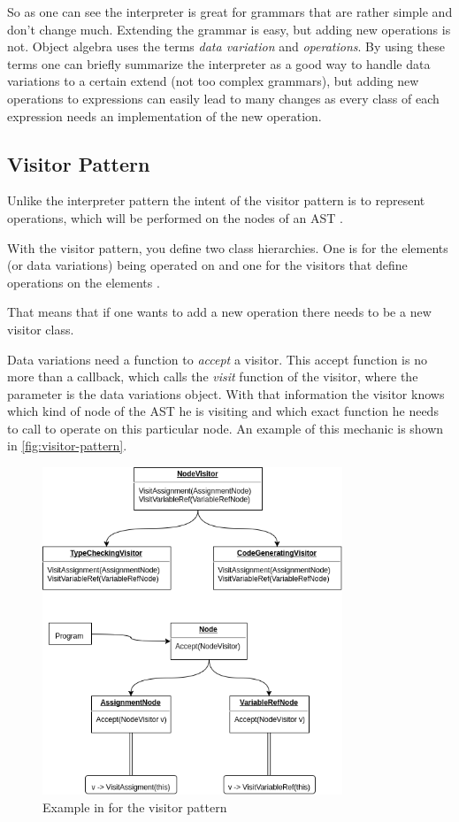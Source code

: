 \documentclass{llncs}
\begin{document}
So as one can see the interpreter is great for grammars that are rather simple and don't change much. Extending the grammar is easy, but adding new operations is not. Object algebra uses the terms \emph{data variation} and \emph{operations}. By using these terms one can briefly summarize the interpreter as a good way to handle data variations to a certain extend (not too complex grammars), but adding new operations to expressions can easily lead to many changes as every class of each expression needs an implementation of the new operation.

\subsection{Visitor Pattern} \label{ssec:visitor}
Unlike the interpreter pattern the intent of the visitor pattern is to represent operations, which will be performed on the nodes of an AST \cite{GHJV94}.

With the visitor pattern, you define two class hierarchies. One is for the elements (or data variations) being operated on and one for the visitors that define operations on the elements \cite{GHJV94}. 

That means that if one wants to add a new operation there needs to be a new visitor class.

Data variations need a function to \emph{accept} a visitor. This accept function is no more than a callback, which calls the \emph{visit} function of the visitor, where the parameter is the data variations object. With that information the visitor knows which kind of node of the AST he is visiting and which exact function he needs to call to operate on this particular node. An example of this mechanic is shown in \autoref{fig:visitor-pattern}.

\begin{figure}[h]
	\centering
	\includegraphics[width=0.8\textwidth]{img/Visitor-Pattern-Example}
	\caption{Example in \cite{GHJV94} for the visitor pattern}
	\label{fig:visitor-pattern}
\end{figure} 
\end{document}
